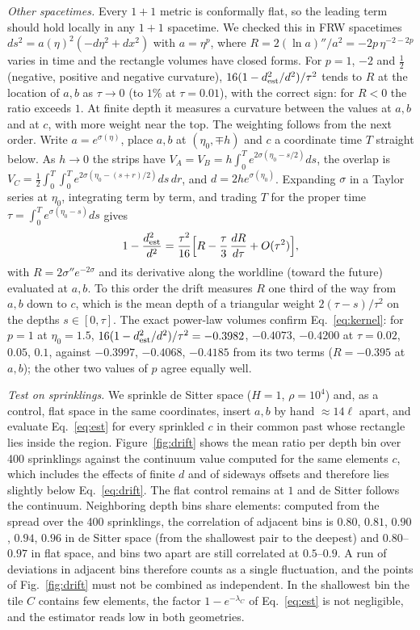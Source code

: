 \documentclass[prd,twocolumn,superscriptaddress,nofootinbib,amsmath,amssymb,floatfix]{revtex4-2}
\begin{document}
\emph{Other spacetimes.} Every $1+1$ metric is conformally flat, so the leading term should hold locally in any $1+1$ spacetime. We checked this in FRW spacetimes $ds^2=a(\eta)^2(-d\eta^2+dx^2)$ with $a=\eta^p$, where $R=2(\ln a)''/a^2=-2p\,\eta^{-2-2p}$ varies in time and the rectangle volumes have closed forms. For $p=1$, $-2$ and $\tfrac12$ (negative, positive and negative curvature), $16(1-d^2_{\rm est}/d^2)/\tau^2$ tends to $R$ at the location of $a,b$ as $\tau\to0$ (to $1\%$ at $\tau=0.01$), with the correct sign: for $R<0$ the ratio exceeds $1$. At finite depth it measures a curvature between the values at $a,b$ and at $c$, with more weight near the top. The weighting follows from the next order. Write $a=e^{\sigma(\eta)}$, place $a,b$ at $(\eta_0,\mp h)$ and $c$ a coordinate time $T$ straight below. As $h\to0$ the strips have $V_A=V_B=h\int_0^Te^{2\sigma(\eta_0-s/2)}ds$, the overlap is $V_C=\tfrac12\int_0^T\!\!\int_0^Te^{2\sigma(\eta_0-(s+r)/2)}ds\,dr$, and $d=2he^{\sigma(\eta_0)}$. Expanding $\sigma$ in a Taylor series at $\eta_0$, integrating term by term, and trading $T$ for the proper time $\tau=\int_0^Te^{\sigma(\eta_0-s)}ds$ gives
\begin{equation}
1-\frac{d^2_{\rm est}}{d^2}=\frac{\tau^2}{16}\Big[R-\frac{\tau}{3}\,\frac{dR}{d\tau}+O(\tau^2)\Big],
\label{eq:kernel}
\end{equation}
with $R=2\sigma''e^{-2\sigma}$ and its derivative along the worldline (toward the future) evaluated at $a,b$. To this order the drift measures $R$ one third of the way from $a,b$ down to $c$, which is the mean depth of a triangular weight $2(\tau-s)/\tau^2$ on the depths $s\in[0,\tau]$. The exact power-law volumes confirm Eq.~\eqref{eq:kernel}: for $p=1$ at $\eta_0=1.5$, $16(1-d^2_{\rm est}/d^2)/\tau^2=-0.3982$, $-0.4073$, $-0.4200$ at $\tau=0.02$, $0.05$, $0.1$, against $-0.3997$, $-0.4068$, $-0.4185$ from its two terms ($R=-0.395$ at $a,b$); the other two values of $p$ agree equally well.

\emph{Test on sprinklings.} We sprinkle de Sitter space ($H=1$, $\rho=10^4$) and, as a control, flat space in the same coordinates, insert $a,b$ by hand $\approx14\ell$ apart, and evaluate Eq.~\eqref{eq:est} for every sprinkled $c$ in their common past whose rectangle lies inside the region. Figure~\ref{fig:drift} shows the mean ratio per depth bin over 400 sprinklings against the continuum value computed for the same elements $c$, which includes the effects of finite $d$ and of sideways offsets and therefore lies slightly below Eq.~\eqref{eq:drift}. The flat control remains at $1$ and de Sitter follows the continuum. Neighboring depth bins share elements: computed from the spread over the 400 sprinklings, the correlation of adjacent bins is $0.80$, $0.81$, $0.90$, $0.94$, $0.96$ in de Sitter space (from the shallowest pair to the deepest) and $0.80$--$0.97$ in flat space, and bins two apart are still correlated at $0.5$--$0.9$. A run of deviations in adjacent bins therefore counts as a single fluctuation, and the points of Fig.~\ref{fig:drift} must not be combined as independent. In the shallowest bin the tile $C$ contains few elements, the factor $1-e^{-\lambda_C}$ of Eq.~\eqref{eq:est} is not negligible, and the estimator reads low in both geometries.
\end{document}
